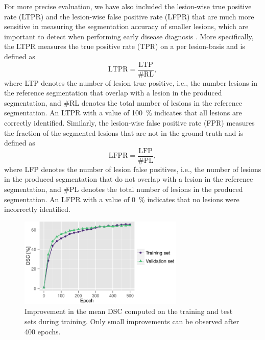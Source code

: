 For more precise evaluation, we have also included the lesion-wise true positive
rate (LTPR) and the lesion-wise false positive rate (LFPR) that are much more
sensitive in measuring the segmentation accuracy of smaller lesions, which are
important to detect when performing early disease diagnosis
\cite{garcia2013review}.
More specifically, the LTPR measures the true positive rate (TPR) on a per
lesion-basis and is defined as
\begin{equation}
\text{LTPR} = \frac{\text{LTP}}{\text{\#RL}},
\end{equation}
where LTP denotes the number of lesion true positive, i.e., the number
lesions in the reference segmentation that overlap with a lesion in the produced
segmentation, and \#RL denotes the total number of lesions in the reference
segmentation. An LTPR with a value of \SI{100}{\percent} indicates that all
lesions are correctly identified. Similarly, the lesion-wise false positive rate
(FPR) measures the fraction of the segmented lesions that are not in the ground
truth and is defined as
\begin{equation}
\text{LFPR} = \frac{\text{LFP}}{\text{\#PL}},
\end{equation}
where LFP denotes the number of lesion false positives, i.e., the number of
lesions in the produced segmentation that do not overlap with a lesion in the
reference segmentation, and \#PL denotes the total number of lesions in the
produced segmentation. An LFPR with a value of \SI{0}{\percent} indicates that
no lesions were incorrectly identified.

\begin{figure}[tb]
\centering
\includegraphics[width=0.7\textwidth]{figures/tmi/ems_progress}
\caption[Improvement in the mean DSC computed on the training and test sets
during training]{Improvement in the mean DSC computed on the training and test
sets during training. Only small improvements can be observed after 400 epochs.}
\label{fig:epochs}
\end{figure}

